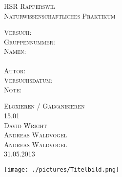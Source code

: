 

\begin{titlepage}
    \begin{center}
        \vspace*{\fill}
        
        \textsc{\LARGE HSR Rapperswil}\\[1cm]
        \textsc{\Large Naturwissenschaftliches Praktikum}\\[2cm]
        
        \begin{minipage}[t]{8cm}
            \textsc{\Large Versuch:}\\[0.5cm]
            \textsc{\Large Gruppennummer:}\\[0.5cm]
            \textsc{\Large Namen:}\\[0.5cm]
            \\[0.5cm]
            \textsc{\Large Autor:}\\[0.5cm]
            \textsc{\Large Versuchsdatum:}\\[0.5cm]
            \textsc{\Large Note:}
        \end{minipage}
        \begin{minipage}[t]{8cm}
            \textsc{\Large Eloxieren / Galvanisieren}\\[0.5cm]
            \textsc{\Large 15.01}\\[0.5cm]
            \textsc{\Large David Wright}\\[0.5cm]
            \textsc{\Large Andreas Waldvogel}\\[0.5cm]
            \textsc{\Large Andreas Waldvogel}\\[0.5cm]
            \textsc{\Large 31.05.2013}
        \end{minipage}
        \vspace{2cm}
     
        \texttt{[image: ./pictures/Titelbild.png]}\\
        \vspace*{\fill}
        
        
        
        
        
    \end{center}
\end{titlepage}